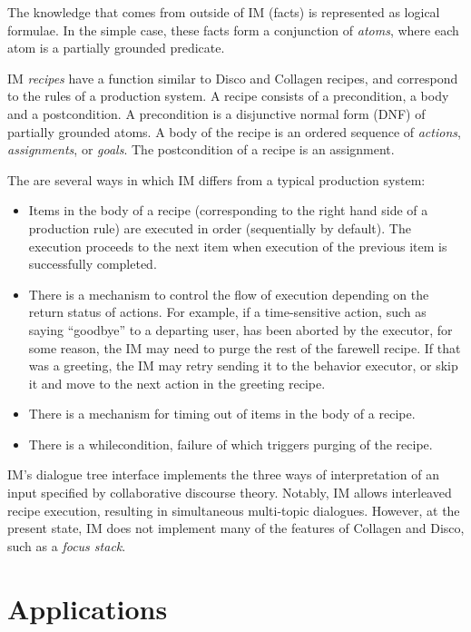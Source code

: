 The knowledge that comes from outside of IM (facts) is represented as logical formulae. In the simple case, these facts form a conjunction of \textsl{atoms}, where each atom is a partially grounded predicate. 

IM \textsl{recipes} have a function similar to Disco and Collagen recipes, and correspond to the rules of a production system. A recipe consists of a precondition, a body and a postcondition. A precondition is a disjunctive normal form (DNF) of partially grounded atoms. A body of the recipe is an ordered sequence of \textsl{actions}, \textsl{assignments}, or \textsl{goals}. The postcondition of a recipe is an assignment.


The are several ways in which IM differs from a typical production system:

\begin{itemize}    
\item Items in the body of a recipe (corresponding to the right hand side of a production rule) are executed in order (sequentially by default). The execution proceeds to the next item when execution of the previous item is successfully completed.
\item There is a mechanism to control the flow of execution depending on the return status of actions. For example, if a time-sensitive action, such as saying ``goodbye'' to a departing user, has been aborted by the executor, for some reason, the IM may need to purge the rest of the farewell recipe. If that was a greeting, the IM may retry sending it to the behavior executor, or skip it and move to the next action in the greeting recipe.
\item There is a mechanism for timing out of items in the body of a recipe.
\item There is a whilecondition, failure of which triggers purging of the recipe.
\end{itemize}

IM's dialogue tree interface implements the three ways of interpretation of an input specified by collaborative discourse theory. Notably, IM allows interleaved recipe execution, resulting in simultaneous multi-topic dialogues. However, at the present state, IM does not implement many of the features of Collagen and Disco, such as a \textsl{focus stack}.

\section{Applications}


